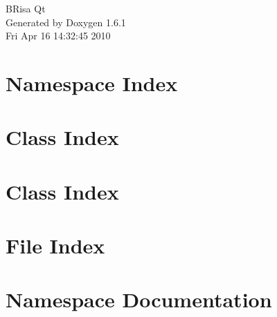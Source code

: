 \documentclass[a4paper]{book}
\begin{document}
\hypersetup{pageanchor=false}
\begin{titlepage}
\vspace*{7cm}
\begin{center}
{\Large BRisa Qt }\\
\vspace*{1cm}
{\large Generated by Doxygen 1.6.1}\\
\vspace*{0.5cm}
{\small Fri Apr 16 14:32:45 2010}\\
\end{center}
\end{titlepage}
\clearemptydoublepage
{}
\tableofcontents
\clearemptydoublepage
{}
\hypersetup{pageanchor=true}
\chapter{Namespace Index}

\chapter{Class Index}

\chapter{Class Index}

\chapter{File Index}

\chapter{Namespace Documentation}


\end{document}
